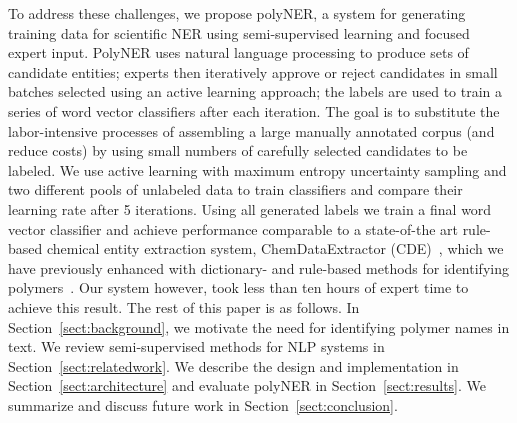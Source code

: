 To address these challenges, we propose polyNER, a system for generating training data for scientific NER using semi-supervised learning and focused expert input. 
PolyNER uses natural language processing to produce sets of candidate entities;
experts then iteratively approve or reject candidates in small batches selected using an active learning approach;
the labels are used to train a series of word vector classifiers after each iteration.
The goal is
to substitute the labor-intensive processes of assembling a large
manually annotated corpus (and reduce costs) by using small numbers of carefully selected candidates to be labeled. 
We use active learning with maximum entropy uncertainty sampling and two different pools of unlabeled data to train classifiers and compare their learning rate after 5 iterations. 
Using all generated labels we train a final word vector classifier and achieve performance comparable to 
a state-of-the art rule-based chemical entity extraction
system, ChemDataExtractor (CDE)~\cite{swain2016chemdataextractor}, which we have previously enhanced
with dictionary- and rule-based methods for identifying polymers~\cite{tchoua2017towards}.
Our system however, took less than ten hours of expert time to achieve this result.
The rest of this paper is as follows. 
In Section~\ref{sect:background}, we motivate the need for identifying polymer names in
text. 
We review semi-supervised methods for NLP systems in
Section~\ref{sect:relatedwork}. 
We describe the design and implementation in Section~\ref{sect:architecture} and evaluate polyNER
in Section~\ref{sect:results}. We summarize and discuss future work in Section~\ref{sect:conclusion}.